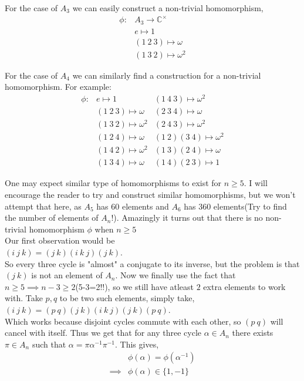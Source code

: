 \documentclass[a4paper,12pt,abstracton]{scrartcl}
\theoremstyle{dotlessP}
\theoremstyle{dotlessS}
\theoremstyle{remark}
\theoremstyle{definition}
\begin{document}
For the case of $A_3$ we can easily construct a non-trivial homomorphism, 
\begin{align*}
\phi:&A_3\rightarrow\mathbb{C}^{\times}\\
&e\mapsto 1\\
&(1\ 2\ 3)\mapsto\omega\\
&(1\ 3\ 2)\mapsto\omega^2
\end{align*}

For the case of $A_4$ we can similarly find a construction for a non-trivial homomorphism. For example:
\begin{align*}
\phi:&e\mapsto 1 &(1\ 4\ 3)\mapsto\omega^2\\
&(1\ 2\ 3)\mapsto\omega &(2\ 3\ 4)\mapsto\omega\\
&(1\ 3\ 2)\mapsto\omega^2 &(2\ 4\ 3)\mapsto\omega^2\\
&(1\ 2\ 4)\mapsto\omega &(1\ 2)(3\ 4)\mapsto\omega^2\\
&(1\ 4\ 2)\mapsto\omega^2 &(1\ 3)(2\ 4)\mapsto\omega\\
&(1\ 3\ 4)\mapsto\omega &(1\ 4)(2\ 3)\mapsto 1
\end{align*}

One may expect similar type of homomorphisms to exist for $n\geq 5$. I will encourage the reader to try and construct similar homomorphisms, but we won't attempt that here, as $A_5$ has $60$ elements and $A_6$ has $360$ elements(Try to find the number of elements of $A_n$!). Amazingly it turns out that there is no non-trivial homomorphism $\phi$ when $n\geq 5$\\

Our first observation would be\\ 
$(i\ j\ k)=(j\ k)(i\ k\ j)(j\ k)$.\\
So every three cycle is "almost" a conjugate to its inverse, but the problem is that $(j\ k)$ is not an element of $A_n$. Now we finally use the fact that $n\geq 5\implies n-3\geq 2$(5-3=2!!), so we still have atleast $2$ extra elements to work with. Take $p,q$ to be two such elements, simply take,\\
$(i\ j\ k)=(p\ q)(j\ k)(i\ k\ j)(j\ k)(p\ q)$.\\
Which works because disjoint cycles commute with each other, so $(p\ q)$ will cancel with itself. Thus we get that for any three cycle $\alpha\in A_n$ there exists $\pi\in A_n$ such that $\alpha=\pi\alpha^{-1}\pi^{-1}$. This gives,
\begin{align*}
&\phi(\alpha)=\phi(\alpha^{-1})\\
\implies&\phi(\alpha)\in\{1,-1\}
\end{align*}
\end{document}
